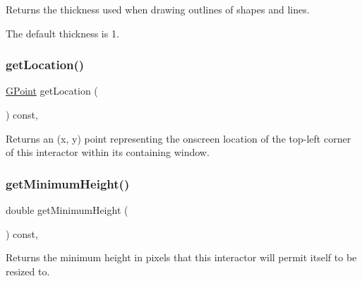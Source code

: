 Returns the thickness used when drawing outlines of shapes and lines. 

The default thickness is 1. \mbox{\label{classsgl_1_1GInteractor_a4f83802015511edeb63b892830812c11}} 
\subsubsection{\texorpdfstring{get\+Location()}{getLocation()}}
{\footnotesize\ttfamily \mbox{\hyperlink{structsgl_1_1GPoint}{G\+Point}} get\+Location (\begin{DoxyParamCaption}{ }\end{DoxyParamCaption}) const\hspace{0.3cm}{\ttfamily [virtual]}, {\ttfamily [inherited]}}



Returns an (x, y) point representing the onscreen location of the top-\/left corner of this interactor within its containing window. 

\mbox{\label{classsgl_1_1GInteractor_aed4b0075fcc434499c3cb3e46896bda3}} 
\subsubsection{\texorpdfstring{get\+Minimum\+Height()}{getMinimumHeight()}}
{\footnotesize\ttfamily double get\+Minimum\+Height (\begin{DoxyParamCaption}{ }\end{DoxyParamCaption}) const\hspace{0.3cm}{\ttfamily [virtual]}, {\ttfamily [inherited]}}



Returns the minimum height in pixels that this interactor will permit itself to be resized to. 

\mbox{\label{classsgl_1_1GInteractor_a66b5af0b32493b4d597ca0a3df2049ea}} 
